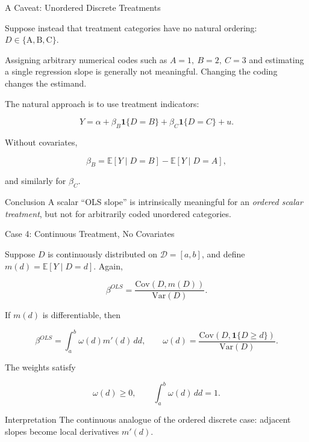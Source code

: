 \documentclass[aspectratio=169,11pt]{beamer}
\begin{document}
\begin{frame}{A Caveat: Unordered Discrete Treatments}
\small

Suppose instead that treatment categories have no natural ordering:
\(D\in\{\text{A},\text{B},\text{C}\}\).

\medskip

Assigning arbitrary numerical codes such as
\(A=1,\ B=2,\ C=3\)
and estimating a single regression slope is generally not meaningful.
Changing the coding changes the estimand.

\medskip

The natural approach is to use treatment indicators:

\[
Y
=
\alpha
+
\beta_B\mathbf{1}\{D=B\}
+
\beta_C\mathbf{1}\{D=C\}
+
u.
\]

Without covariates,

\[
\beta_B
=
\mathbb{E}[Y\mid D=B]
-
\mathbb{E}[Y\mid D=A],
\]

and similarly for \(\beta_C\).

\begin{block}{Conclusion}
A scalar ``OLS slope'' is intrinsically meaningful for an
\emph{ordered scalar treatment}, but not for arbitrarily coded
unordered categories.
\end{block}

\end{frame}



\begin{frame}{Case 4: Continuous Treatment, No Covariates}
\small

Suppose \(D\) is continuously distributed on
\(\mathcal{D}=[a,b]\), and define
\(m(d)=\mathbb{E}[Y\mid D=d]\). Again,

\[
\beta^{OLS}
=
\frac{
\mathrm{Cov}(D,m(D))
}{
\mathrm{Var}(D)
}.
\]

If \(m(d)\) is differentiable, then

\[
\boxed{
\beta^{OLS}
=
\int_a^b
\omega(d)m'(d)\,dd,
}
\qquad
\boxed{
\omega(d)
=
\frac{
\mathrm{Cov}
\left(
D,\mathbf{1}\{D\geq d\}
\right)
}{
\mathrm{Var}(D)
}.
}
\]

The weights satisfy

\[
\omega(d)\geq 0,
\qquad
\int_a^b\omega(d)\,dd=1.
\]

\begin{block}{Interpretation}
The continuous analogue of the ordered discrete case: adjacent
slopes become local derivatives \(m'(d)\).
\end{block}

\end{frame}
\end{document}
